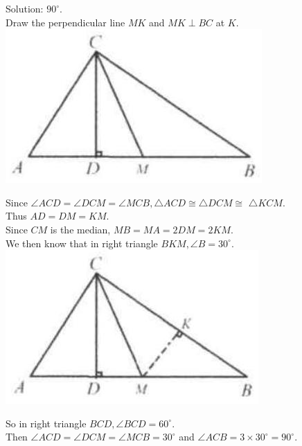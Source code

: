 \documentclass[10pt]{article}
\begin{document}
Solution: \(90^{\circ}\).\\
Draw the perpendicular line \(M K\) and \(M K \perp B C\) at \(K\).\\
\includegraphics[max width=\textwidth, center]{2025_04_17_97bc1f7e44d93c271a88g-081(3)}

Since \(\angle A C D=\angle D C M=\angle M C B, \triangle A C D \cong \triangle D C M \cong\) \(\triangle K C M\).\\
Thus \(A D=D M=K M\).\\
Since \(C M\) is the median, \(M B=M A=2 D M=2 K M\).\\
We then know that in right triangle \(B K M, \angle B=30^{\circ}\).\\
\includegraphics[max width=\textwidth, center]{2025_04_17_97bc1f7e44d93c271a88g-081(1)}

So in right triangle \(B C D, \angle B C D=60^{\circ}\).\\
Then \(\angle A C D=\angle D C M=\angle M C B=30^{\circ}\) and \(\angle A C B=3 \times 30^{\circ}=90^{\circ}\).
\end{document}
